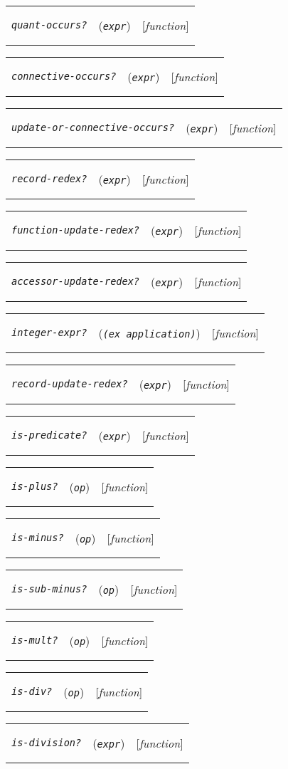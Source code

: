 \documentclass[12pt]{book}
\makeatletter
\newenvironment{function}[3]%
{\par\noindent\begin{boxedminipage}{\textwidth}%
 \par\noindent\begin{tabularx}{\linewidth}{l>{\raggedright}Xr}%
 \functionhtgt{#1}&(\texttt{\textit{#2}})&[\emph{#3}]%
 \end{tabularx}\par\flushright\begin{minipage}{.97\textwidth}}
{\end{minipage}\end{boxedminipage}}
\newcommand{\functionnm}[1]{\texttt{\textit{#1}}}
\newcommand{\functionhtgt}[1]{\hypertarget{#1}{\functionnm{#1}}\index{#1@\functionnm{#1}|underline}}
\newenvironment{lispfunction}[2]%
{\begin{function}{#1}{#2}{function}}{\end{function}}
\makeatother
\begin{document}
\begin{lispfunction}{quant-occurs?}{expr}
\end{lispfunction}

\begin{lispfunction}{connective-occurs?}{expr}
\end{lispfunction}

\begin{lispfunction}{update-or-connective-occurs?}{expr}
\end{lispfunction}

\begin{lispfunction}{record-redex?}{expr}
\end{lispfunction}

\begin{lispfunction}{function-update-redex?}{expr}
\end{lispfunction}

\begin{lispfunction}{accessor-update-redex?}{expr}
\end{lispfunction}

\begin{lispfunction}{integer-expr?}{(ex application)}
\end{lispfunction}

\begin{lispfunction}{record-update-redex?}{expr}
\end{lispfunction}

\begin{lispfunction}{is-predicate?}{expr}
\end{lispfunction}

\begin{lispfunction}{is-plus?}{op}
\end{lispfunction}

\begin{lispfunction}{is-minus?}{op}
\end{lispfunction}

\begin{lispfunction}{is-sub-minus?}{op}
\end{lispfunction}

\begin{lispfunction}{is-mult?}{op}
\end{lispfunction}

\begin{lispfunction}{is-div?}{op}
\end{lispfunction}

\begin{lispfunction}{is-division?}{expr}
\end{lispfunction}
\end{document}
